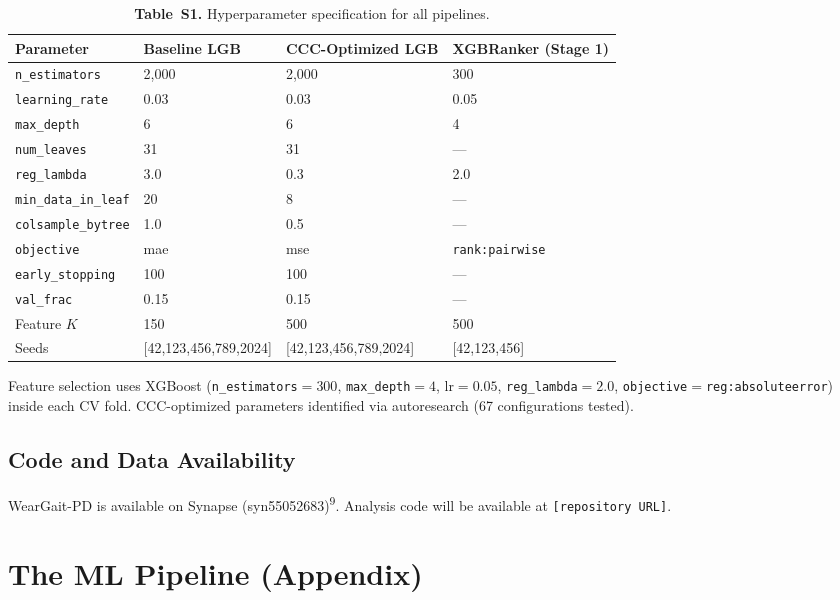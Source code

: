 \documentclass[11pt,a4paper]{article}
\newcommand{\tabnote}[1]{\par\vspace{2pt}\noindent\begin{minipage}{\linewidth}\small\itshape\raggedright #1\par\end{minipage}\par\vspace{0.4em}}
\begin{document}
\begin{table}[H]
\centering
\captionsetup{labelformat=empty}
\caption{\textbf{Table~S1.} Hyperparameter specification for all pipelines.}
\label{tab:hpS1}
\small
\begin{tabular}{llll}
\toprule
\textbf{Parameter} & \textbf{Baseline LGB} & \textbf{CCC-Optimized LGB} & \textbf{XGBRanker (Stage 1)} \\
\midrule
\texttt{n\_estimators}     & 2,000 & 2,000 & 300 \\
\texttt{learning\_rate}    & 0.03  & 0.03  & 0.05 \\
\texttt{max\_depth}        & 6     & 6     & 4 \\
\texttt{num\_leaves}       & 31    & 31    & --- \\
\texttt{reg\_lambda}       & 3.0   & 0.3   & 2.0 \\
\texttt{min\_data\_in\_leaf} & 20  & 8     & --- \\
\texttt{colsample\_bytree} & 1.0   & 0.5   & --- \\
\texttt{objective}         & mae   & mse   & \texttt{rank:pairwise} \\
\texttt{early\_stopping}   & 100   & 100   & --- \\
\texttt{val\_frac}         & 0.15  & 0.15  & --- \\
Feature $K$                & 150   & 500   & 500 \\
Seeds                      & [42,123,456,789,2024] & [42,123,456,789,2024] & [42,123,456] \\
\bottomrule
\end{tabular}
\tabnote{Feature selection uses XGBoost (\texttt{n\_estimators}$=300$, \texttt{max\_depth}$=4$, lr$=0.05$, \texttt{reg\_lambda}$=2.0$, \texttt{objective}$=$\texttt{reg:absoluteerror}) inside each CV fold. CCC-optimized parameters identified via autoresearch (67 configurations tested).}
\end{table}
\captionsetup{labelformat=default}

\subsection{Code and Data Availability}

WearGait-PD is available on Synapse (syn55052683)\textsuperscript{9}. Analysis code will be available at \texttt{[repository URL]}.

\section{The ML Pipeline (Appendix)}
\setcounter{figure}{0}
\renewcommand{\thefigure}{\Alph{figure}}
\end{document}
